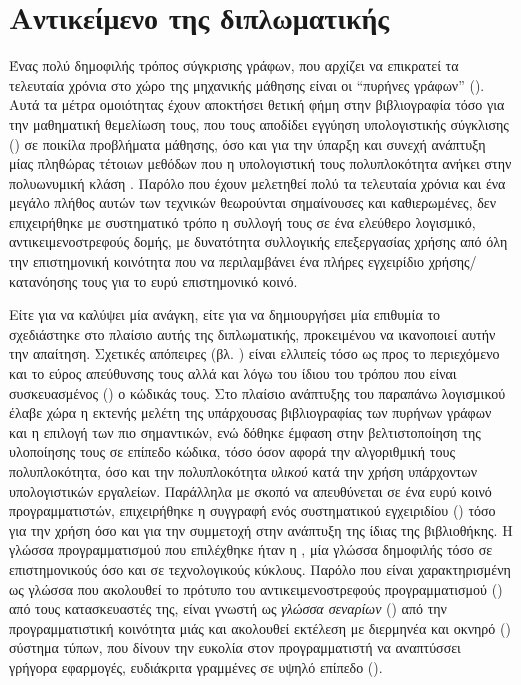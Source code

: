 \section{Αντικείμενο της διπλωματικής}
Ένας πολύ δημοφιλής τρόπος σύγκρισης γράφων, που αρχίζει να επικρατεί τα τελευταία χρόνια στο χώρο της μηχανικής μάθησης είναι οι ``πυρήνες γράφων'' ().
Αυτά τα μέτρα ομοιότητας έχουν αποκτήσει θετική φήμη στην βιβλιογραφία τόσο για την μαθηματική θεμελίωση τους, που τους αποδίδει εγγύηση υπολογιστικής σύγκλισης () σε ποικίλα προβλήματα μάθησης, όσο και για την ύπαρξη και συνεχή ανάπτυξη μίας πληθώρας τέτοιων μεθόδων που η υπολογιστική τους πολυπλοκότητα ανήκει στην πολυωνυμική κλάση .
Παρόλο που έχουν μελετηθεί πολύ τα τελευταία χρόνια και ένα μεγάλο πλήθος αυτών των τεχνικών θεωρούνται σημαίνουσες και καθιερωμένες, δεν επιχειρήθηκε με συστηματικό τρόπο η συλλογή τους σε ένα ελεύθερο λογισμικό, αντικειμενοστρεφούς δομής, με δυνατότητα συλλογικής επεξεργασίας χρήσης από όλη την επιστημονική κοινότητα που να περιλαμβάνει ένα πλήρες εγχειρίδιο χρήσης/κατανόησης τους για το ευρύ επιστημονικό κοινό.\par
Είτε για να καλύψει μία ανάγκη, είτε για να δημιουργήσει μία επιθυμία το \textbf{} σχεδιάστηκε στο πλαίσιο αυτής της διπλωματικής, προκειμένου να ικανοποιεί αυτήν την απαίτηση.
Σχετικές απόπειρες (βλ. \cite{sugiyama2017graphkernels}) είναι ελλιπείς τόσο ως προς το περιεχόμενο και το εύρος απεύθυνσης τους αλλά και λόγω του ίδιου του τρόπου που είναι συσκευασμένος () ο κώδικάς τους.
Στο πλαίσιο ανάπτυξης του παραπάνω λογισμικού έλαβε χώρα η εκτενής μελέτη της υπάρχουσας βιβλιογραφίας των πυρήνων γράφων και η επιλογή των πιο σημαντικών, ενώ δόθηκε έμφαση στην βελτιστοποίηση της υλοποίησης τους σε επίπεδο κώδικα, τόσο όσον αφορά την αλγοριθμική τους πολυπλοκότητα, όσο και την πολυπλοκότητα \textit{υλικού} κατά την χρήση υπάρχοντων υπολογιστικών εργαλείων.
Παράλληλα με σκοπό να απευθύνεται σε ένα ευρύ κοινό προγραμματιστών, επιχειρήθηκε η συγγραφή ενός συστηματικού εγχειριδίου () τόσο για την χρήση όσο και για την συμμετοχή στην ανάπτυξη της ίδιας της βιβλιοθήκης.
Η γλώσσα προγραμματισμού που επιλέχθηκε ήταν η , μία γλώσσα δημοφιλής τόσο σε επιστημονικούς όσο και σε τεχνολογικούς κύκλους.
Παρόλο που είναι χαρακτηρισμένη ως γλώσσα που ακολουθεί το πρότυπο του αντικειμενοστρεφούς προγραμματισμού () από τους κατασκευαστές της, είναι γνωστή ως \textit{γλώσσα σεναρίων} () από την προγραμματιστική κοινότητα μιάς και ακολουθεί εκτέλεση με διερμηνέα και οκνηρό () σύστημα τύπων, που δίνουν την ευκολία στον προγραμματιστή να αναπτύσσει γρήγορα  εφαρμογές, ευδιάκριτα γραμμένες σε υψηλό επίπεδο ().
